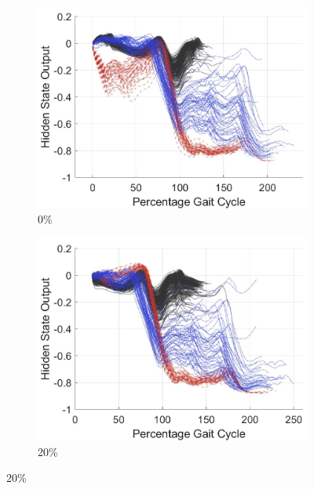 \begin{figure}[!hbt]
    \centering
     \begin{subfigure}[H]{0.28\textwidth}
         \centering
         \includegraphics[width=\textwidth]{content/4-LSTM_Behaviour/results/hidden_state/accel_x_w_v_sa-sd/0_Participant_04.jpg}
         \caption{0\%}
         \label{subfig:a}
     \end{subfigure}
     \begin{subfigure}[H]{0.28\textwidth}
         \centering
         \includegraphics[width=\textwidth]{content/4-LSTM_Behaviour/results/hidden_state/accel_x_w_v_sa-sd/20_Participant_04.jpg}
         \caption{20\%}
         \label{subfig:b}
     \end{subfigure}

\end{figure}
